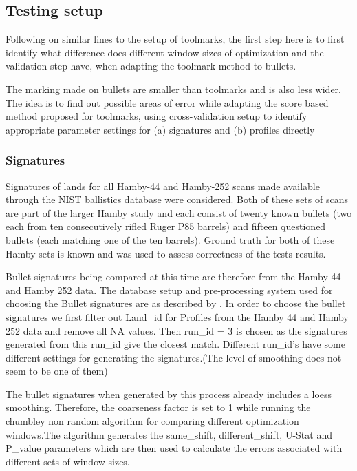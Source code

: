 \documentclass[12pt]{article}
\begin{document}
\subsection{Testing setup}\label{testing-setup}

Following on similar lines to the setup of toolmarks, the first step
here is to first identify what difference does different window sizes of
optimization and the validation step have, when adapting the toolmark
method to bullets.

The marking made on bullets are smaller than toolmarks and is also less
wider. The idea is to find out possible areas of error while adapting
the score based method proposed for toolmarks, using cross-validation
setup to identify appropriate parameter settings for (a) signatures and
(b) profiles directly

\subsubsection{Signatures}\label{signatures}

Signatures of lands for all Hamby-44 and Hamby-252 scans made available
through the NIST ballistics database \citep{nist} were considered. Both
of these sets of scans are part of the larger Hamby study \citep{hamby}
and each consist of twenty known bullets (two each from ten
consecutively rifled Ruger P85 barrels) and fifteen questioned bullets
(each matching one of the ten barrels). Ground truth for both of these
Hamby sets is known and was used to assess correctness of the tests
results.

Bullet signatures being compared at this time are therefore from the
Hamby 44 and Hamby 252 data. The database setup and pre-processing
system used for choosing the Bullet signatures are as described by
\citet{aoas}. In order to choose the bullet signatures we first filter
out Land\_id for Profiles from the Hamby 44 and Hamby 252 data and
remove all NA values. Then run\_id = 3 is chosen as the signatures
generated from this run\_id give the closest match. Different run\_id's
have some different settings for generating the signatures.(The level of
smoothing does not seem to be one of them)

The bullet signatures when generated by this process already includes a
loess smoothing. Therefore, the coarseness factor is set to 1 while
running the chumbley non random algorithm for comparing different
optimization windows.The algorithm generates the same\_shift,
different\_shift, U-Stat and P\_value parameters which are then used to
calculate the errors associated with different sets of window sizes.
\end{document}
